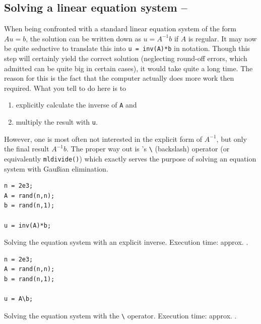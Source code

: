 \subsection{Solving a linear equation system -- \cleansymbol\cleansymbol\fastsymbol\fastsymbol\fastsymbol}
When being confronted with a standard linear equation system of the form $Au=b$, the solution can be written down as $u = A^{-1}b$ if $A$ is regular. It may now be quite seductive to translate this into \lstinline!u = inv(A)*b! in \matlab{} notation. Though this step will certainly yield the correct solution (neglecting round-off errors, which admitted can be quite big in certain cases), it would take quite a long time. The reason for this is the fact that the computer actually does more work then required. What you tell \matlab{} to do here is to
\begin{enumerate}
\item explicitly calculate the inverse of \lstinline!A! and
\item multiply the result with \lstinline!u!.
\end{enumerate}
However, one is most often not interested in the explicit form of $A^{-1}$, but only the final result $A^{-1}b$. The proper way out is \matlab{}'s \lstinline!\! (backslash) operator (or equivalently \lstinline!mldivide()!) which exactly serves the purpose of solving an equation system with Gau{\ss}ian elimination.


\hfill
\begin{minipage}[t]{.45\textwidth}
\begin{lstlisting}[framerule=2pt,rulecolor=\color{badred}]
n = 2e3;
A = rand(n,n);
b = rand(n,1);

u = inv(A)*b;
\end{lstlisting}
Solving the equation system with an explicit inverse. Execution time: approx. .
\end{minipage}
\hfill
\begin{minipage}[t]{.45\textwidth}
\begin{lstlisting}[framerule=2pt,rulecolor=\color{goodgreen}]
n = 2e3;
A = rand(n,n);
b = rand(n,1);

u = A\b;
\end{lstlisting}
Solving the equation system with the \lstinline!\! operator. Execution time: approx. .
\end{minipage}
\hfill

